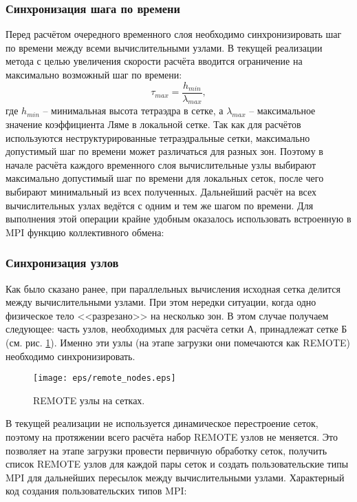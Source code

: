 \subsubsection{Синхронизация шага по времени}
Перед расчётом очередного временного слоя необходимо синхронизировать шаг по времени между всеми вычислительными узлами. В текущей реализации метода с целью увеличения скорости расчёта вводится ограничение на максимально возможный шаг по времени:
\begin{equation}
\label{max_time_step}
\tau_{max}=\frac{h_{min}}{\lambda_{max}},
\end{equation}
где $h_{min}$ -- минимальная высота тетраэдра в сетке, а $\lambda_{max}$ --
максимальное значение коэффициента Ляме в локальной сетке. Так как для расчётов
используются неструктурированные тетраэдральные сетки, максимально допустимый
шаг по времени может различаться для разных зон. Поэтому в начале расчёта
каждого временного слоя вычислительные узлы выбирают максимально допустимый шаг
по времени для локальных сеток, после чего выбирают минимальный из всех
полученных. Дальнейший расчёт на всех вычислительных узлах ведётся с одним и тем
же шагом по времени. Для выполнения этой операции крайне удобным оказалось
использовать встроенную в MPI функцию коллективного
обмена:
\subsubsection{Синхронизация узлов}
Как было сказано ранее, при параллельных вычисления исходная сетка делится между вычислительными узлами. При этом нередки ситуации, когда одно физическое тело <<разрезано>> на несколько зон. В этом случае получаем следующее: часть узлов, необходимых для расчёта сетки А, принадлежат сетке Б (см. рис. \ref{pic:remote_nodes}). Именно эти узлы (на этапе загрузки они помечаются как REMOTE) необходимо синхронизировать.
\begin{figure}[htp]
\centering
\texttt{[image: eps/remote\_nodes.eps]}
\caption{REMOTE узлы на сетках.}
\label{pic:remote_nodes}
\end{figure}
В текущей реализации не используется динамическое перестроение сеток, поэтому на протяжении всего расчёта набор REMOTE узлов не меняется. Это позволяет на этапе загрузки провести первичную обработку сеток, получить список REMOTE узлов для каждой пары сеток и создать пользовательские типы MPI для дальнейших пересылок между вычислительными узлами. Характерный код создания пользовательских типов MPI:


